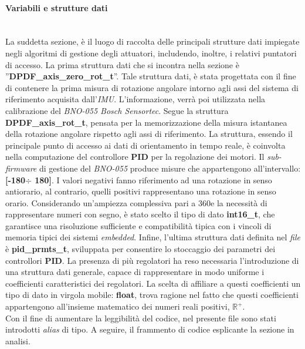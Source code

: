 \paragraph{Variabili e strutture dati}\mbox{}\\
La suddetta sezione, è il luogo di raccolta delle principali strutture dati impiegate negli algoritmi di gestione degli attuatori, includendo, inoltre, i relativi puntatori di accesso.
La prima struttura dati che si incontra nella sezione è ''\textbf{DPDF\_axis\_zero\_rot\_t}''. Tale struttura dati, è stata progettata con il fine di contenere la prima misura di rotazione angolare intorno agli assi
del sistema di riferimento acquisita dall'\textit{IMU}. L'informazione, verrà poi utilizzata nella calibrazione del \textit{BNO-055 Bosch Sensortec}.
Segue la struttura \textbf{DPDF\_axis\_rot\_t}, pensata per la memorizzazione della misura istantanea della rotazione angolare rispetto agli assi di riferimento. La struttura, essendo il principale punto di accesso ai dati di orientamento in tempo reale, è coinvolta nella computazione del controllore \textbf{PID} per la regolazione dei motori.
Il \textit{sub-firmware} di gestione del \textit{BNO-055} produce misure che appartengono all'intervallo: \textbf{[-180\degree$\div$ 180]}. I valori negativi fanno riferimento ad una rotazione in senso antiorario, al contrario, quelli positivi rappresentano una rotazione in senso orario. Considerando un'ampiezza complessiva pari a 360\degree e la necessità di rappresentare numeri con segno, è stato scelto il tipo
di dato \textbf{int16\_t}, che garantisce una risoluzione sufficiente e compatibilità tipica con i vincoli di memoria tipici dei sistemi \textit{embedded}.
Infine, l'ultima struttura dati definita nel \textit{file} è \textbf{pid\_prmts\_t}, sviluppata per consentire lo stoccaggio dei parametri dei controllori \textbf{PID}. La presenza di più regolatori ha reso necessaria l'introduzione di una struttura dati generale, capace di rappresentare in
modo uniforme i coefficienti caratteristici dei regolatori. La scelta di affiliare a questi coefficienti un tipo di dato in virgola mobile: \textbf{float}, trova ragione nel fatto che questi coefficienti appartengono all'insieme matematico dei numeri reali positivi, $\mathbb{R}^+$.\\
Con il fine di aumentare la leggibilità del codice, nel presente file sono stati introdotti \textit{alias} di tipo.
A seguire, il frammento di codice esplicante la sezione in analisi.\\


